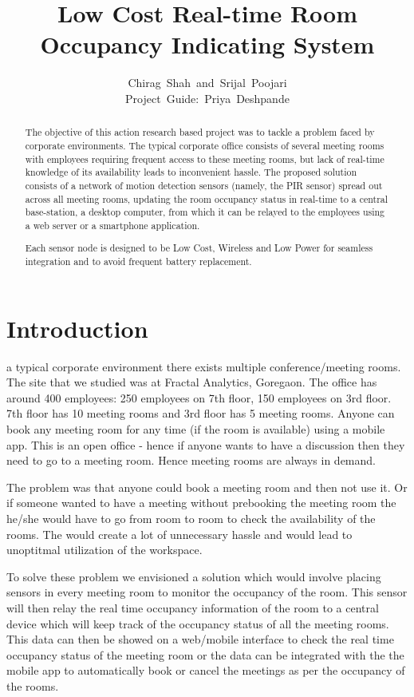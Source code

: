 \documentclass[journal]{IEEEtran}
\begin{document}
\title{Low Cost Real-time Room Occupancy Indicating System}
\author{Chirag~Shah~and~Srijal~Poojari
        \\Project~Guide:~Priya~Deshpande}


\maketitle
\begin{abstract}
The objective of this action research based project was to tackle a problem faced by corporate environments. The typical corporate office consists of several meeting rooms with employees requiring frequent access to these meeting rooms, but lack of real-time knowledge of its availability leads to inconvenient hassle. The proposed solution consists of a network of motion detection sensors (namely, the PIR sensor) spread out across all meeting rooms, updating the room occupancy status in real-time to a central base-station, a desktop computer, from which it can be relayed to the employees using a web server or a smartphone application.

Each sensor node is designed to be Low Cost, Wireless and Low Power for seamless integration and to avoid frequent battery replacement.
\end{abstract}


\section{Introduction}
 a typical corporate environment there exists multiple conference/meeting rooms.
The site that we studied was at Fractal Analytics, Goregaon. The office has around 400 employees: 250 employees on 7th floor, 150 employees on 3rd floor. 7th floor has 10 meeting rooms and 3rd floor has 5 meeting rooms. Anyone can book any meeting room for any time (if the room is available) using a mobile app. This is an open office - hence if anyone wants to have a discussion then they need to go to a meeting room. Hence meeting rooms are always in demand.


The problem was that anyone could book a meeting room and then not use it. Or if someone wanted to have a meeting without prebooking the meeting room the he/she would have to go from room to room to check the availability of the rooms. The would create a lot of unnecessary hassle and would lead to unoptitmal utilization of the workspace.


To solve these problem we envisioned a solution which would involve placing sensors in every meeting room to monitor the occupancy of the room. This sensor will then relay the real time occupancy information of the room to a central device which will keep track of the occupancy status of all the meeting rooms. This data can then be showed on a web/mobile interface to check the real time occupancy status of the meeting room or the data can be integrated with the the mobile app to automatically book or cancel the meetings as per the occupancy of the rooms.
\end{document}
